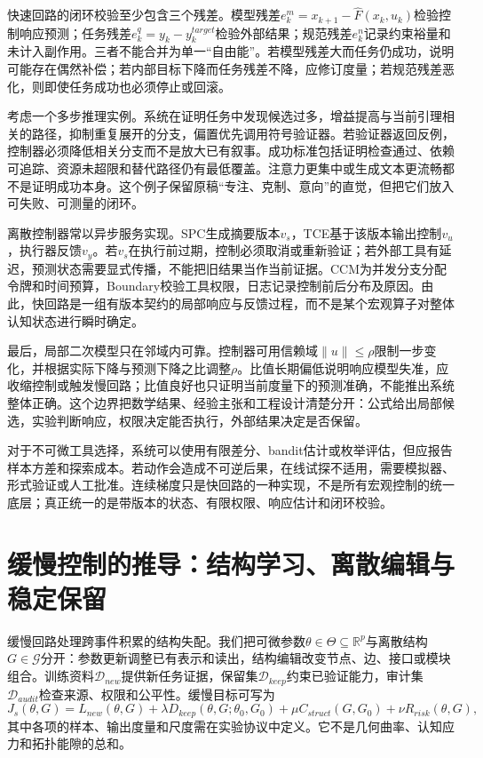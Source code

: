 快速回路的闭环校验至少包含三个残差。模型残差$e^m_k=x_{k+1}-\widehat F(x_k,u_k)$检验控制响应预测；任务残差$e^q_k=y_k-y_k^{target}$检验外部结果；规范残差$e^n_k$记录约束裕量和未计入副作用。三者不能合并为单一“自由能”。若模型残差大而任务仍成功，说明可能存在偶然补偿；若内部目标下降而任务残差不降，应修订度量；若规范残差恶化，则即使任务成功也必须停止或回滚。

考虑一个多步推理实例。系统在证明任务中发现候选过多，增益提高与当前引理相关的路径，抑制重复展开的分支，偏置优先调用符号验证器。若验证器返回反例，控制器必须降低相关分支而不是放大已有叙事。成功标准包括证明检查通过、依赖可追踪、资源未超限和替代路径仍有最低覆盖。注意力更集中或生成文本更流畅都不是证明成功本身。这个例子保留原稿“专注、克制、意向”的直觉，但把它们放入可失败、可测量的闭环。

离散控制器常以异步服务实现。SPC生成摘要版本$v_s$，TCE基于该版本输出控制$v_u$，执行器反馈$v_y$。若$v_s$在执行前过期，控制必须取消或重新验证；若外部工具有延迟，预测状态需要显式传播，不能把旧结果当作当前证据。CCM为并发分支分配令牌和时间预算，Boundary校验工具权限，日志记录控制前后分布及原因。由此，快回路是一组有版本契约的局部响应与反馈过程，而不是某个宏观算子对整体认知状态进行瞬时确定。

最后，局部二次模型只在邻域内可靠。控制器可用信赖域$\|u\|\le\rho$限制一步变化，并根据实际下降与预测下降之比调整$\rho$。比值长期偏低说明响应模型失准，应收缩控制或触发慢回路；比值良好也只证明当前度量下的预测准确，不能推出系统整体正确。这个边界把数学结果、经验主张和工程设计清楚分开：公式给出局部候选，实验判断响应，权限决定能否执行，外部结果决定是否保留。

对于不可微工具选择，系统可以使用有限差分、bandit估计或枚举评估，但应报告样本方差和探索成本。若动作会造成不可逆后果，在线试探不适用，需要模拟器、形式验证或人工批准。连续梯度只是快回路的一种实现，不是所有宏观控制的统一底层；真正统一的是带版本的状态、有限权限、响应估计和闭环校验。

\section{缓慢控制的推导：结构学习、离散编辑与稳定保留}
\label{sec:tce_slow_loop_derivation}

缓慢回路处理跨事件积累的结构失配。我们把可微参数$\theta\in\Theta\subseteq\mathbb{R}^{p}$与离散结构$G\in\mathcal{G}$分开：参数更新调整已有表示和读出，结构编辑改变节点、边、接口或模块组合。训练资料$\mathcal{D}_{new}$提供新任务证据，保留集$\mathcal{D}_{keep}$约束已验证能力，审计集$\mathcal{D}_{audit}$检查来源、权限和公平性。缓慢目标可写为
\[
J_s(\theta,G)=L_{new}(\theta,G)+\lambda D_{keep}(\theta,G;\theta_0,G_0)
+\mu C_{struct}(G,G_0)+\nu R_{risk}(\theta,G),
\]
其中各项的样本、输出度量和尺度需在实验协议中定义。它不是几何曲率、认知应力和拓扑能隙的总和。

